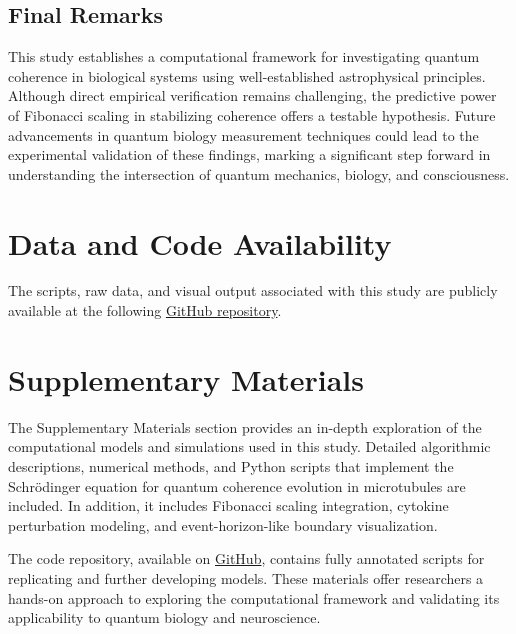 \documentclass[entropy,article,submit,oneauthor,pdftex]{Definitions/mdpi}
\begin{document}
\subsection{Final Remarks}  
This study establishes a computational framework for investigating quantum coherence in biological systems using well-established astrophysical principles. Although direct empirical verification remains challenging, the predictive power of Fibonacci scaling in stabilizing coherence offers a testable hypothesis. Future advancements in quantum biology measurement techniques could lead to the experimental validation of these findings, marking a significant step forward in understanding the intersection of quantum mechanics, biology, and consciousness.





\vspace{6pt} 

\section{Data and Code Availability}
The scripts, raw data, and visual output associated with this study are publicly available at
the following \href{https://github.com/TheonlyqueenAC/Microtubule\_Simulation}{GitHub repository}.

\section{Supplementary Materials}
The Supplementary Materials section provides an in-depth exploration of the computational models and simulations used in this study. Detailed algorithmic descriptions, numerical methods, and Python scripts that implement the Schrödinger equation for quantum coherence evolution in microtubules are included. In addition, it includes Fibonacci scaling integration, cytokine perturbation modeling, and event-horizon-like boundary visualization.

The code repository, available on \href{https://github.com/TheonlyqueenAC/Microtubule_Simulation}{GitHub}, contains fully annotated scripts for replicating and further developing models. These materials offer researchers a hands-on approach to exploring the computational framework and validating its applicability to quantum biology and neuroscience.
\end{document}

